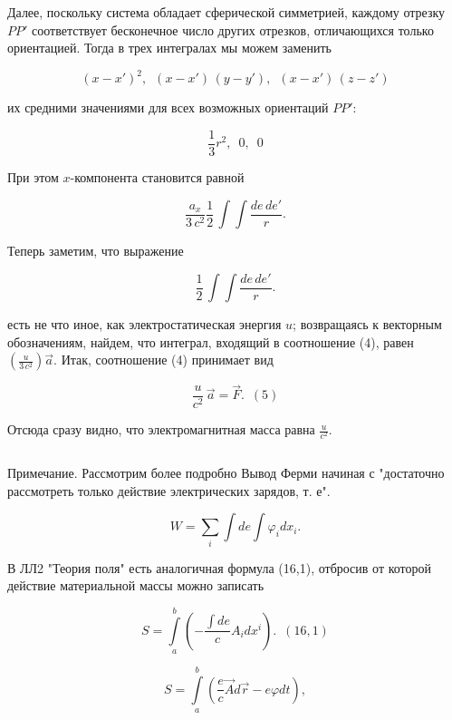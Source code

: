 \documentclass[11pt]{article}
\makeatletter
\newcommand{\boxspacing}{\kern\kvtcb@left@rule\kern\kvtcb@boxsep}
\newcommand{\prompt}[4]{
        {\ttfamily\llap{{\color{#2}[#3]:\hspace{3pt}#4}}\vspace{-\baselineskip}}
    }
\makeatother
\begin{document}
    Далее, поскольку система обладает сферической симметрией, каждому
отрезку \(PP'\) соответствует бесконечное число других отрезков,
отличающихся только ориентацией. Тогда в трех интегралах мы можем
заменить

\[\left(x-x'\right)^2, \,\,\,
\left(x-x'\right) \, \left(y - y'\right), \,\,\,
\left(x-x'\right) \, \left(z - z'\right)\]

их средними значениями для всех возможных ориентаций \(PP'\):

\[\frac{1}{3}r^2, \,\,\,0, \,\,\,0\]

При этом \(x\)-компонента становится равной

\[\frac{a_x}{3 \, c^2}\frac{1}{2} \, \int \int\frac{{de\,de'}}{r}.\]

Теперь заметим, что выражение

\[\frac{1}{2} \, \int \int\frac{{de\,de'}}{r}.\]

есть не что иное, как электростатическая энергия \(u\); возвращаясь к
векторным обозначениям, найдем, что интеграл, входящий в соотношение
(4), равен \(\left(\frac{u}{3 \, c^2}\right) \vec {a}\). Итак, соотношение
(4) принимает вид

\[\frac{u}{c^2} \,\vec {a} = \vec {F}. \,\,\, (5)\]

Отсюда сразу видно, что электромагнитная масса равна \(\frac{u}{c^2}\).

    \begin{tcolorbox}[breakable, size=fbox, boxrule=1pt, pad at break*=1mm,colback=cellbackground, colframe=cellborder]
\prompt{In}{incolor}{ }{\boxspacing}
\begin{Verbatim}[commandchars=\\\{\}]

\end{Verbatim}
\end{tcolorbox}

    Примечание. Рассмотрим более подробно Вывод Ферми начиная с "достаточно
рассмотреть только действие электрических зарядов, т. е".

\[W=\sum_i\int de \int \varphi_i dx_i.\]

    В ЛЛ2 "Теория поля" есть аналогичная формула (16,1), отбросив от которой
действие материальной массы можно записать

\[S = \int\limits_{a}^{b} \left(-\frac{\int de}{c}A_i d x^i\right).\,\,\,  (16,1)\]

\[S = \int\limits_{a}^{b} \left(\frac{e}{c}\vec A d\vec r - e \varphi dt \right),\]
\end{document}
